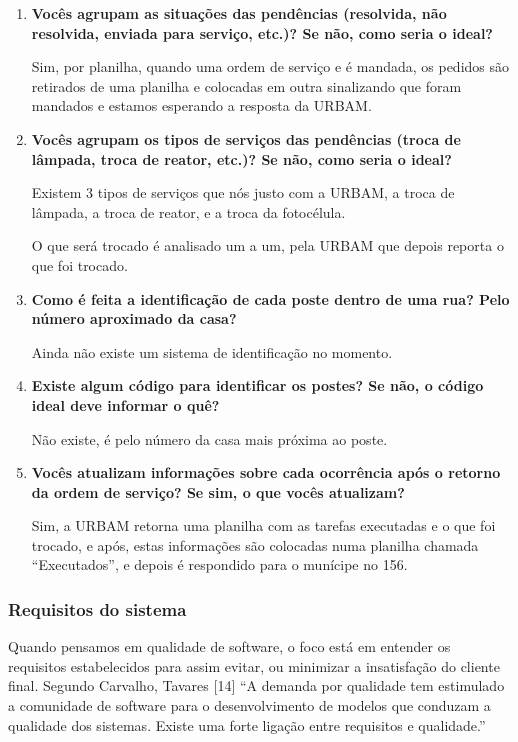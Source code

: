 \documentclass[
	article,			%
	11pt,				%
	oneside,			%
	a4paper,			%
	english,			%
	brazil,				%
	sumario=tradicional
	]{abntex2}
\begin{document}
\begin{enumerate}
\item \textbf{Vocês agrupam as situações das pendências (resolvida, não resolvida,
enviada para serviço, etc.)? Se não, como seria o ideal?}

Sim, por planilha, quando uma ordem de serviço e é mandada, os pedidos são
retirados de uma planilha e colocadas em outra sinalizando que foram mandados
e estamos esperando a resposta da URBAM.

\item \textbf{Vocês agrupam os tipos de serviços das pendências (troca de lâmpada,
troca de reator, etc.)? Se não, como seria o ideal?}

Existem 3 tipos de serviços que nós justo com a URBAM, a troca de lâmpada, a
troca de reator, e a troca da fotocélula.

O que será trocado é analisado um a um, pela URBAM que depois reporta o que
foi trocado.

\item \textbf{Como é feita a identificação de cada poste dentro de uma rua? Pelo
número aproximado da casa?}

Ainda não existe um sistema de identificação no momento.

\item \textbf{Existe algum código para identificar os postes? Se não, o código ideal
deve informar o quê?}

Não existe, é pelo número da casa mais próxima ao poste.

\item \textbf{Vocês atualizam informações sobre cada ocorrência após o retorno da
ordem de serviço? Se sim, o que vocês atualizam?}

Sim, a URBAM retorna uma planilha com as tarefas executadas e o que foi
trocado, e após, estas informações são colocadas numa planilha chamada
“Executados”, e depois é respondido para o munícipe no 156.
\end{enumerate}

\subsubsection{Requisitos do sistema}

Quando pensamos em qualidade de software, o foco está em entender os requisitos
estabelecidos para assim evitar, ou minimizar a insatisfação do cliente final.
Segundo Carvalho, Tavares [14] “A demanda por qualidade tem estimulado a
comunidade de software para o desenvolvimento de modelos que conduzam a
qualidade dos sistemas. Existe uma forte ligação entre requisitos e qualidade.”
\end{document}
